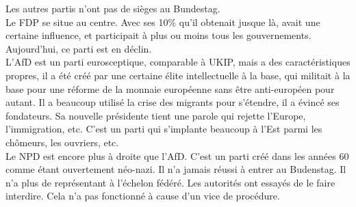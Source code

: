 \documentclass[10pt, a4paper, openany]{book}
\begin{document}
Les autres partis n'ont pas de sièges au Bundestag. \\
Le FDP se situe au centre. Avec ses 10\% qu'il obtenait jusque là, avait une certaine influence, et participait à plus ou moins tous les gouvernements. Aujourd'hui, ce parti est en déclin. \\
L'AfD est un parti eurosceptique, comparable à UKIP, mais a des caractéristiques propres, il a été créé par une certaine élite intellectuelle à la base, qui militait à la base pour une réforme de la monnaie européenne sans être anti-européen pour autant. Il a beaucoup utilisé la crise des migrants pour s'étendre, il a évincé ses fondateurs. Sa nouvelle présidente tient une parole qui rejette l'Europe, l'immigration, etc. C'est un parti qui s'implante beaucoup à l'Est parmi les chômeurs, les ouvriers, etc. \\
Le NPD est encore plus à droite que l'AfD. C'est un parti créé dans les années 60 comme étant ouvertement néo-nazi. Il n'a jamais réussi à entrer au Budenstag. Il n'a plus de représentant à l'échelon fédéré. Les autorités ont essayés de le faire interdire. Cela n'a pas fonctionné à cause d'un vice de procédure. \\
\end{document}
